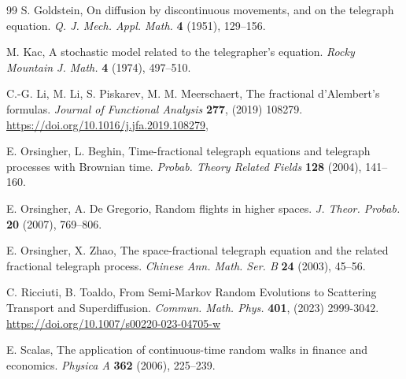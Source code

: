 \documentclass[10pt,a4paper]{article}
\numberwithin{equation}{section}
\theoremstyle{plain}
\theoremstyle{remark}
\begin{document}
\begin{thebibliography}{99}
S. Goldstein,
On diffusion by discontinuous movements, and on the telegraph equation.
\textit{Q. J. Mech. Appl. Math.} \textbf{4} (1951), 129--156.

M. Kac,
A stochastic model related to the telegrapher's equation.
\textit{Rocky Mountain J. Math.} \textbf{4} (1974), 497--510.

C.-G. Li, M. Li, S. Piskarev, M. M. Meerschaert,
The fractional d'Alembert's formulas.
\textit{Journal of Functional Analysis} \textbf{277}, (2019) 108279.
\url{https://doi.org/10.1016/j.jfa.2019.108279},


E. Orsingher, L. Beghin,
Time-fractional telegraph equations and telegraph processes with Brownian time.
\textit{Probab. Theory Related Fields} \textbf{128} (2004), 141--160.

E. Orsingher, A. De Gregorio,
Random flights in higher spaces.
\textit{J. Theor. Probab.} \textbf{20} (2007), 769--806.

E. Orsingher, X. Zhao,
The space-fractional telegraph equation and the related fractional telegraph process.
\textit{Chinese Ann. Math. Ser. B} \textbf{24} (2003), 45--56.

C. Ricciuti, B. Toaldo, 
From Semi-Markov Random Evolutions to Scattering Transport and Superdiffusion. 
\textit{Commun. Math. Phys.} \textbf{401},  (2023) 2999-3042. 
\url{https://doi.org/10.1007/s00220-023-04705-w}

E. Scalas,
The application of continuous-time random walks in finance and economics.
\textit{Physica A} \textbf{362} (2006), 225--239.

\end{thebibliography}
\end{document}
